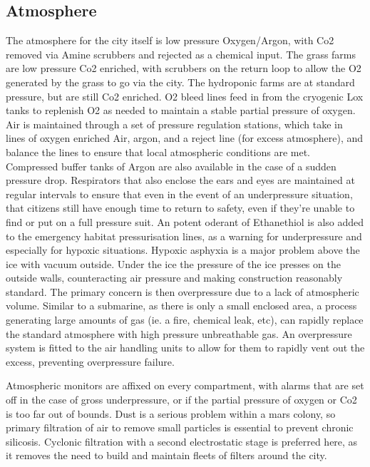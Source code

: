 \documentclass[10pt]{article}
\begin{document}
\subsection*{Atmosphere}
The atmosphere for the city itself is low pressure Oxygen/Argon, with Co2 removed via Amine scrubbers and rejected as a chemical input. The grass farms are low pressure Co2 enriched, with scrubbers on the return loop to allow the O2 generated by the grass to go via the city. The hydroponic farms are at standard pressure, but are still Co2 enriched. O2 bleed lines feed in from the cryogenic Lox tanks to replenish O2 as needed to maintain a stable partial pressure of oxygen. Air is maintained through a set of pressure regulation stations, which take in lines of oxygen enriched Air, argon, and a reject line (for excess atmosphere), and balance the lines to ensure that local atmospheric conditions are met. Compressed buffer tanks of Argon are also available in the case of a sudden pressure drop. Respirators that also enclose the ears and eyes are maintained at regular intervals to ensure that even in the event of an underpressure situation, that citizens still have enough time to return to safety, even if they're unable to find or put on a full pressure suit. An potent oderant of Ethanethiol is also added to the emergency habitat pressurisation lines, as a warning for underpressure and especially for hypoxic situations. Hypoxic asphyxia is a major problem above the ice with vacuum outside. Under the ice the pressure of the ice presses on the outside walls, counteracting air pressure and making construction reasonably standard. The primary concern is then overpressure due to a lack of atmospheric volume. Similar to a submarine, as there is only a small enclosed area, a process generating large amounts of gas (ie. a fire, chemical leak, etc), can rapidly replace the standard atmosphere with high pressure unbreathable gas. An overpressure system is fitted to the air handling units to allow for them to rapidly vent out the excess, preventing overpressure failure.

Atmospheric monitors are affixed on every compartment, with alarms that are set off in the case of gross underpressure, or if the partial pressure of oxygen or Co2 is too far out of bounds. Dust is a serious problem within a mars colony, so primary filtration of air to remove small particles is essential to prevent chronic silicosis. Cyclonic filtration with a second electrostatic stage is preferred here, as it removes the need to build and maintain fleets of filters around the city. 
\end{document}
